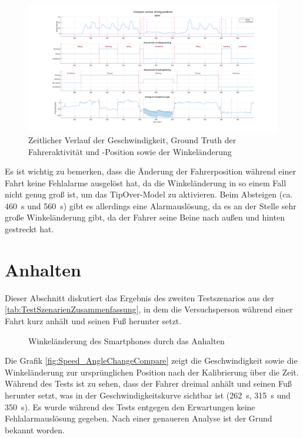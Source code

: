 \begin{figure}[H]
	\centering
	\includegraphics[width=\linewidth]{Bilder/Speed_Groundtruth_WalkStand_Compare.png}
	\caption{Zeitlicher Verlauf der Geschwindigkeit, Ground Truth der Fahreraktivität und -Position sowie der Winkeländerung}
	\label{fig:Speed_Groundtruth_WalkStand_Compare}
\end{figure}

Es ist wichtig zu bemerken, dass die Änderung der Fahrerposition während einer Fahrt keine Fehlalarme ausgelöst hat, da die Winkeländerung in so einem Fall nicht genug groß ist, um das \glqq TipOver\grqq{}-Model zu aktivieren. Beim Absteigen (ca. \SI{460}{\second} und \SI{560}{\second}) gibt es allerdings eine Alarmauslösung, da es an der Stelle sehr große Winkeländerung gibt, da der Fahrer seine Beine nach außen und hinten gestreckt hat.
\section{Anhalten}
Dieser Abschnitt diskutiert das Ergebnis des zweiten Testszenarios aus der \autoref{tab:TestSzenarienZusammenfassung}, in dem die Versuchsperson während einer Fahrt kurz anhält und seinen Fuß herunter setzt.

\begin{figure}
	\centering
	\caption{Winkeländerung des Smartphones durch das Anhalten}
	\label{fig:Speed_AngleChangeCompare}
\end{figure}
Die Grafik \autoref{fig:Speed_AngleChangeCompare} zeigt die Geschwindigkeit sowie die Winkeländerung zur ursprünglichen Position nach der Kalibrierung über die Zeit.
Während des Tests ist zu sehen, dass der Fahrer dreimal anhält und seinen Fuß herunter setzt, was in der Geschwindigkeitskurve sichtbar ist (\SI{262}{\second}, \SI{315}{\second} und \SI{350}{\second}). Es wurde während des Tests entgegen den Erwartungen keine Fehlalarmauslösung gegeben. Nach einer genaueren Analyse ist der Grund bekannt worden.

